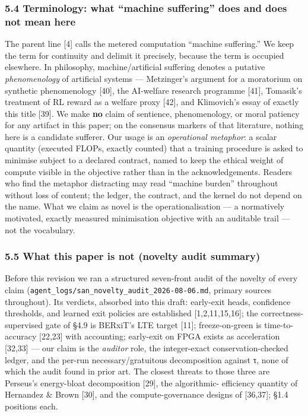 \documentclass[
]{article}
\begin{document}
\hypertarget{terminology-what-machine-suffering-does-and-does-not-mean-here}{%
\subsubsection{5.4 Terminology: what ``machine suffering'' does and does
not mean
here}\label{terminology-what-machine-suffering-does-and-does-not-mean-here}}

The parent line {[}4{]} calls the metered computation ``machine
suffering.'' We keep the term for continuity and delimit it precisely,
because the term is occupied elsewhere. In philosophy,
machine/artificial suffering denotes a putative \emph{phenomenology} of
artificial systems --- Metzinger's argument for a moratorium on
synthetic phenomenology {[}40{]}, the AI-welfare research programme
{[}41{]}, Tomasik's treatment of RL reward as a welfare proxy {[}42{]},
and Klimovich's essay of exactly this title {[}39{]}. We make
\textbf{no} claim of sentience, phenomenology, or moral patiency for any
artifact in this paper; on the consensus markers of that literature,
nothing here is a candidate sufferer. Our usage is an \emph{operational
metaphor}: a scalar quantity (executed FLOPs, exactly counted) that a
training procedure is asked to minimise subject to a declared contract,
named to keep the ethical weight of compute visible in the objective
rather than in the acknowledgements. Readers who find the metaphor
distracting may read ``machine burden'' throughout without loss of
content; the ledger, the contract, and the kernel do not depend on the
name. What we claim as novel is the operationalisation --- a normatively
motivated, exactly measured minimisation objective with an auditable
trail --- not the vocabulary.

\hypertarget{what-this-paper-is-not-novelty-audit-summary}{%
\subsubsection{5.5 What this paper is not (novelty audit
summary)}\label{what-this-paper-is-not-novelty-audit-summary}}

Before this revision we ran a structured seven-front audit of the
novelty of every claim
(\texttt{agent\_logs/san\_novelty\_audit\_2026-08-06.md}, primary
sources throughout). Its verdicts, absorbed into this draft: early-exit
heads, confidence thresholds, and learned exit policies are established
{[}1,2,11,15,16{]}; the correctness-supervised gate of §4.9 is BERxiT's
LTE target {[}11{]}; freeze-on-green is time-to-accuracy {[}22,23{]}
with accounting; early-exit on FPGA exists as acceleration {[}32,33{]}
--- our claim is the \emph{auditor} role, the integer-exact
conservation-checked ledger, and the per-run necessary/gratuitous
decomposition against τ, none of which the audit found in prior art. The
closest threats to those three are Perseus's energy-bloat decomposition
{[}29{]}, the algorithmic- efficiency quantity of Hernandez \& Brown
{[}30{]}, and the compute-governance designs of {[}36,37{]}; §1.4
positions each.
\end{document}
